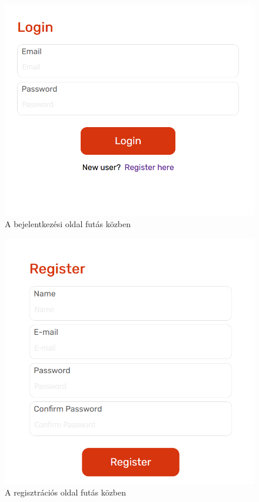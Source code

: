 \begin{figure}[h]
\centering
\includegraphics[scale=0.3]{images/LoginTest.png}
\caption{A bejelentkezési oldal futás közben}
\label{fig:loginTest}
\end{figure}

\begin{figure}[h]
\centering
\includegraphics[scale=0.3]{images/RegisterTest.png}
\caption{A regisztrációs oldal futás közben}
\label{fig:registerTest}
\end{figure}


